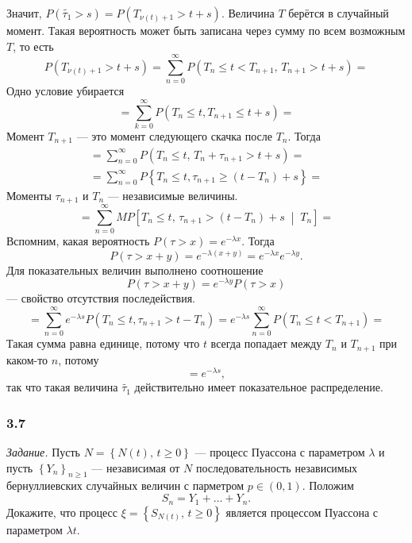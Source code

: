\begin{enumerate}[label=\alph*)]
  Значит,
  $P \left( \tilde{ \tau_1} > s \right) =
    P \left( T_{ \nu \left( t \right) + 1} > t + s \right) $.
  Величина $T$ берётся в случайный момент.
  Такая вероятность может быть записана через сумму по всем возможным $T$, то есть
  $$P \left( T_{ \nu \left( t \right) + 1} > t + s \right) =
    \sum \limits_{n = 0}^{ \infty }
      P \left( T_n \leq t < T_{n + 1}, \, T_{n + 1} > t + s \right) =$$
  Одно условие убирается
  $$ = \sum \limits_{k = 0}^{ \infty } P \left( T_n \leq t, T_{n + 1} \leq t + s \right) =$$
  Момент $T_{n + 1}$ --- это момент следующего скачка после $T_n$.
  Тогда
  \begin{gather*}
    = \sum \limits_{n = 0}^{ \infty }
      P \left( T_n \leq t, \, T_n + \tau_{n + 1} > t + s \right) = \\
    = \sum \limits_{n = 0}^{ \infty }
      P \left\{ T_n \leq t, \tau_{n + 1} \geq \left( t - T_n \right) + s \right\} =
  \end{gather*}
  Моменты $ \tau_{n + 1}$ и $T_n$ --- независимые величины.
  $$= \sum \limits_{n = 0}^{ \infty }
    MP \left[ T_n \leq t, \, \tau_{n + 1} > \left( t - T_n \right) + s \; \middle| \;
    T_n \right] =$$
  Вспомним, какая вероятность $P \left( \tau > x \right) = e^{-\lambda x}$.
  Тогда
  $$P \left( \tau > x + y \right) =
    e^{-\lambda \left( x + y \right) } =
    e^{-\lambda x} e^{-\lambda y}.$$
  Для показательных величин выполнено соотношение
  $$P \left( \tau > x + y \right) =
    e^{-\lambda y} P \left( \tau > x \right) $$
  --- свойство отсутствия последействия.
  $$= \sum \limits_{n = 0}^{ \infty }
      e^{-\lambda s} P \left( T_n \leq t, \tau_{n + 1} > t - T_n \right) =
    e^{-\lambda s} \sum \limits_{n = 0}^{ \infty } P \left( T_n \leq t < T_{n + 1} \right) =$$
  Такая сумма равна единице,
  потому что $t$ всегда попадает между $T_n$ и $T_{n + 1}$ при каком-то $n$, потому
  $$= e^{-\lambda s},$$
  так что такая величина $ \tilde{ \tau_1}$ действительно имеет показательное распределение.
\end{enumerate}

\subsubsection*{3.7}

\textit{Задание.}
Пусть $N = \left\{ N \left( t \right), \, t \geq 0 \right\} $ ---
процесс Пуассона с параметром $ \lambda $ и пусть $ \left\{ Y_n \right\}_{n \geq 1}$ ---
независимая от $N$ последовательность независимых бернуллиевских случайных величин с парметром
$p \in \left( 0, 1 \right) $.
Положим
$$S_n = Y_1 + \dotsc + Y_n.$$
Докажите, что процесс $ \xi = \left\{ S_{N \left( t \right)}, \, t \geq 0 \right\} $
является процессом Пуассона с параметром $ \lambda t$.

